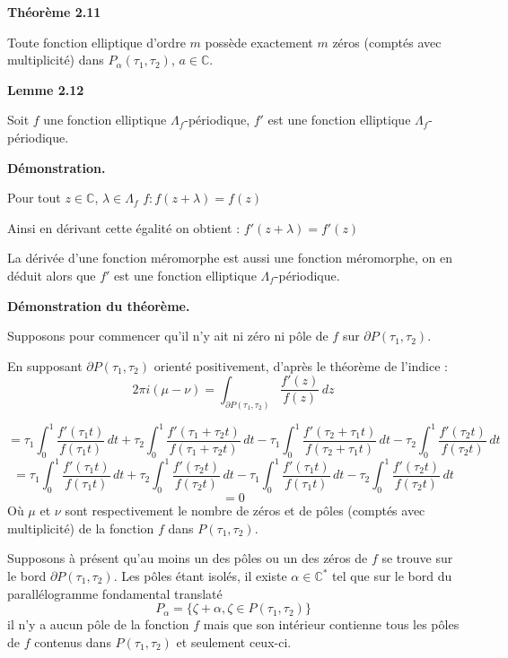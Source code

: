 \documentclass{article}
\begin{document}
\textbf{Théorème 2.11}

Toute fonction elliptique d'ordre \( m \) possède exactement \( m \) zéros (comptés avec multiplicité) dans \( P_{\alpha}(\tau_1, \tau_2) \), \( a \in \mathbb{C} \).

\textbf{Lemme 2.12}

Soit \( f \) une fonction elliptique \( \Lambda_f \)-périodique, \( f' \) est une fonction elliptique \( \Lambda_f\)-périodique.

\textbf{Démonstration.}

Pour tout \( z \in \mathbb{C} \), \( \lambda \in \Lambda_f \) \( f: f(z + \lambda) = f(z) \)

Ainsi en dérivant cette égalité on obtient : \( f'(z + \lambda) = f'(z) \)

La dérivée d'une fonction méromorphe est aussi une fonction méromorphe, on en déduit alors que \( f' \) est une fonction 
elliptique \( \Lambda_f \)-périodique.

\textbf{Démonstration du théorème.}

Supposons pour commencer qu'il n'y ait ni zéro ni pôle de \( f \) sur \( \partial P(\tau_1, \tau_2) \).

En supposant \( \partial P(\tau_1, \tau_2) \) orienté positivement, d'après le théorème de l'indice :
\[
2\pi i(\mu - \nu) = \int_{\partial P(\tau_1, \tau_2)} \frac{f'(z)}{f(z)} \, dz
\]

\[
= \tau_1  \int_0^1 \frac{f'(\tau_1 t)}{f(\tau_1 t)} \, dt + \tau_2 \int_0^1 \frac{f'(\tau_1 + \tau_2 t)}{f(\tau_1 + \tau_2 t)} \, dt - \tau_1 \int_0^1 \frac{f'(\tau_2 + \tau_1 t)}{f(\tau_2 + \tau_1 t)} \, dt - \tau_2 \int_0^1 \frac{f'(\tau_2 t)}{f(\tau_2 t)} \, dt 
\]
\[
= \tau_1  \int_0^1 \frac{f'(\tau_1 t)}{f(\tau_1 t)} \, dt + \tau_2\int_0^1 \frac{f'( \tau_2 t)}{f( \tau_2 t)} \, dt - \tau_1\int_0^1 \frac{f'( \tau_1 t)}{f( \tau_1 t)} \, dt - \tau_2\int_0^1 \frac{f'(\tau_2 t)}{f(\tau_2 t)} \, dt
\]
\[
= 0
\]
Où \( \mu \) et \( \nu \) sont respectivement le nombre de zéros et de pôles (comptés avec multiplicité) de la fonction \( f \) dans \( P(\tau_1, \tau_2) \).

Supposons à présent qu'au moins un des pôles ou un des zéros de \( f \) se trouve sur le bord \( \partial P(\tau_1, \tau_2) \). Les pôles étant isolés, il existe \( \alpha \in \mathbb{C}^* \) tel que sur le bord du parallélogramme fondamental translaté
\[
P_\alpha = \{\zeta + \alpha, \zeta \in P(\tau_1, \tau_2)\}
\]
il n'y a aucun pôle de la fonction \( f \) mais que son intérieur contienne tous les pôles de \( f \) contenus dans \( P(\tau_1, \tau_2) \) et seulement ceux-ci.
\end{document}
